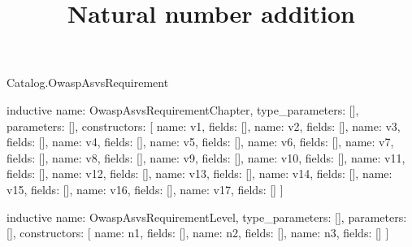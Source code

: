 \begin{lexlean}{Catalog.OwaspAsvsRequirement}
\title{Natural number addition}
\begin{semanticmodule}
inductive{
  name: OwaspAsvsRequirementChapter,
  type_parameters: [],
  parameters: [],
  constructors: [
    {name: v1, fields: []},
    {name: v2, fields: []},
    {name: v3, fields: []},
    {name: v4, fields: []},
    {name: v5, fields: []},
    {name: v6, fields: []},
    {name: v7, fields: []},
    {name: v8, fields: []},
    {name: v9, fields: []},
    {name: v10, fields: []},
    {name: v11, fields: []},
    {name: v12, fields: []},
    {name: v13, fields: []},
    {name: v14, fields: []},
    {name: v15, fields: []},
    {name: v16, fields: []},
    {name: v17, fields: []}
  ]
}

inductive{
  name: OwaspAsvsRequirementLevel,
  type_parameters: [],
  parameters: [],
  constructors: [
    {name: n1, fields: []},
    {name: n2, fields: []},
    {name: n3, fields: []}
  ]
}


\end{semanticmodule}
\end{lexlean}
